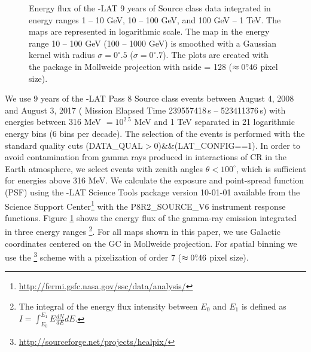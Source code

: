 \begin{figure}[h]
\caption{
Energy flux of the \Fermi-LAT 9 years of Source class data integrated in energy ranges 1 -- 10 GeV, 10 -- 100 GeV, and 100 GeV -- 1 TeV.
The maps are represented in logarithmic scale. 
The map in the energy range 10 -- 100 GeV (100 -- 1000 GeV) 
is smoothed with a Gaussian kernel with radius $\sigma = 0^\circ\!\!.5$ ($\sigma = 0^\circ\!\!.7$).
The plots are created with the \Healpix package \citep{2005ApJ...622..759G} in Mollweide projection with 
nside = 128 ($\approx 0^\circ\!\!.46$ pixel size). 
}
\label{fig:Maps_data}
\end{figure}

We use 9 years of the \Fermi-LAT Pass 8 Source class events
between August 4, 2008  and August 3, 2017 ({\Fermi} Mission Elapsed Time 239557418\,s -- 523411376\,s)
with energies between 316 MeV $ = 10^{2.5}$ MeV
and 1 TeV separated in 21 logarithmic energy bins (6 bins per decade).
The selection of the events is performed with the standard quality cuts (DATA\_QUAL$>$0)\&\&(LAT\_CONFIG==1).
In order to avoid contamination from gamma rays produced in interactions of CR in the Earth atmosphere, 
we select events with zenith angles $\theta < 100^{\circ}$,
which is sufficient for energies above 316 MeV.
We calculate the exposure and point-spread function (PSF) using the {\Fermi}-LAT Science Tools package version 
10-01-01 available from the {\Fermi} Science Support Center\footnote{\url{http://fermi.gsfc.nasa.gov/ssc/data/analysis/}} 
with the P8R2\_SOURCE\_V6 instrument response functions.
Figure \ref{fig:Maps_data} shows the energy flux of the gamma-ray emission
integrated in three energy ranges%
\footnote{The integral of the energy flux intensity between $E_0$ and $E_1$ is defined as
$I = \int_{E_0}^{E_1} E \frac{dN}{dE} dE.$}.
For all maps shown in this paper, we use Galactic coordinates centered on the GC in Mollweide projection. %
For spatial binning we use the \Healpix\footnote{\url{http://sourceforge.net/projects/healpix/}} \citep{2005ApJ...622..759G} scheme with a pixelization of order 7  
($\approx 0^\circ\!\!.46$ pixel size). 

